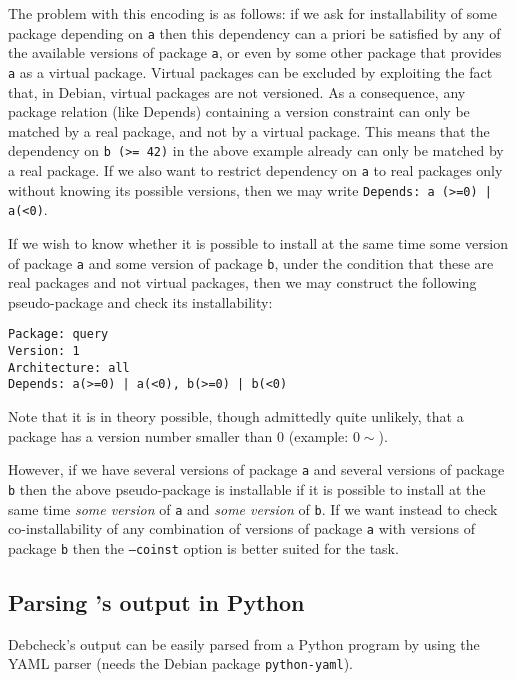 The problem with this encoding is as follows: if we ask \debcheck{}
for installability of some package depending on \texttt{a} then this
dependency can a priori be satisfied by any of the available versions
of package \texttt{a}, or even by some other package that provides
\texttt{a} as a virtual package. Virtual packages can be excluded by
exploiting the fact that, in Debian, virtual packages are not
versioned. As a consequence, any package relation (like Depends)
containing a version constraint can only be matched by a real package,
and not by a virtual package. This means that the dependency on
\texttt{b (>= 42)} in the above example already can only be matched by
a real package. If we also want to restrict dependency on \texttt{a}
to real packages only without knowing its possible versions, then we
may write \texttt{Depends: a (>=0) | a(<0)}.

\begin{example}
  If we wish to know whether it is possible to install at the same
  time some version of package \texttt{a} and some version of package
  \texttt{b}, under the condition that these are real packages and not
  virtual packages, then we may construct the following pseudo-package
  and check its installability:
\begin{verbatim}
Package: query
Version: 1
Architecture: all
Depends: a(>=0) | a(<0), b(>=0) | b(<0)
\end{verbatim}
\end{example}

Note that it is in theory possible, though admittedly quite unlikely,
that a package has a version number smaller than $0$ (example:
$0\sim$).

However, if we have several versions of package \texttt{a} and several
versions of package \texttt{b} then the above pseudo-package is
installable if it is possible to install at the same time \emph{some
  version} of \texttt{a} and \emph{some version} of \texttt{b}. If we
want instead to check co-installability of any combination of versions
of package \texttt{a} with versions of package \texttt{b} then the
\texttt{--coinst} option is better suited for the task.

\subsection{Parsing \debcheck's output in Python}
\label{sec:tricks-python}
Debcheck's output can be easily parsed from a Python program by using
the YAML parser (needs the Debian package \texttt{python-yaml}).

